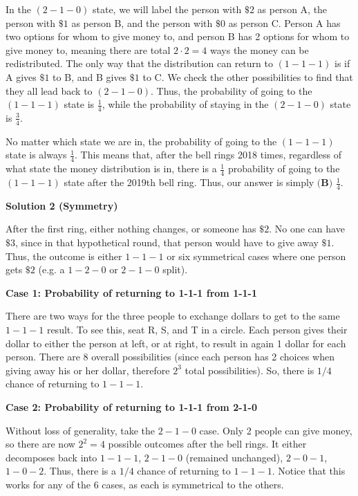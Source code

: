 \begin{enumerate}
 
In the $(2-1-0)$ state, we will label the person with $\$2$ as person A, the person with $\$1$ as person B, and the person with $\$0$ as person C. Person A has two options for whom to give money to, and person B has 2 options for whom to give money to, meaning there are total $2\cdot 2 = 4$ ways the money can be redistributed. The only way that the distribution can return to $(1-1-1)$ is if A gives $\$1$ to B, and B gives $\$1$ to C. We check the other possibilities to find that they all lead back to $(2-1-0)$. Thus, the probability of going to the $(1-1-1)$ state is $\frac{1}{4}$, while the probability of staying in the $(2-1-0)$ state is $\frac{3}{4}$.

 No matter which state we are in, the probability of going to the $(1-1-1)$ state is always $\frac{1}{4}$. This means that, after the bell rings 2018 times, regardless of what state the money distribution is in, there is a $\frac{1}{4}$ probability of going to the $(1-1-1)$ state after the 2019th bell ring. Thus, our answer is simply $\boxed{\textbf{(B) } \frac{1}{4}}$.

 



\textbf{Solution 2 (Symmetry)}

After the first ring, either nothing changes, or someone has $\$2$. No one can have $\$3$, since in that hypothetical round, that person would have to give away $\$1$. Thus, the outcome is either $1-1-1$ or six symmetrical cases where one person gets $\$2$ (e.g. a $1-2-0$ or $2-1-0$ split). 

 
\textbf{Case 1: Probability of returning to 1-1-1 from 1-1-1}

 There are two ways for the three people to exchange dollars to get to the same $1-1-1$ result. To see this, seat R, S, and T in a circle. Each person gives their dollar to either the person at left, or at right, to result in again 1 dollar for each person. There are 8 overall possibilities (since each person has 2 choices when giving away his or her dollar, therefore $2^3$ total possibilities). So, there is $1/4$ chance of returning to $1-1-1$. 

 
\textbf{Case 2: Probability of returning to 1-1-1 from 2-1-0}

 Without loss of generality, take the $2-1-0$ case. Only 2 people can give money, so there are now $2^2=4$ possible outcomes after the bell rings. It either decomposes back into $1-1-1$, $2-1-0$ (remained unchanged), $2-0-1$, $1-0-2$. Thus, there is a $1/4$ chance of returning to $1-1-1$. Notice that this works for any of the 6 cases, as each is symmetrical to the others.


\end{enumerate}
